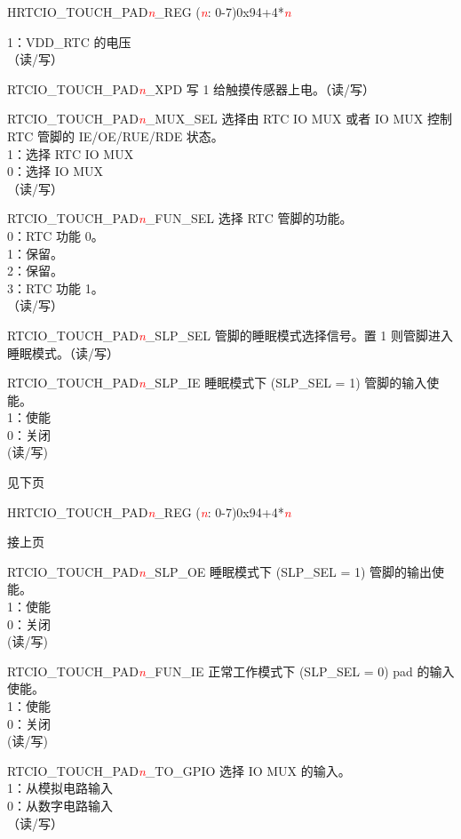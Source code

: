 \begin{register}{H}{RTCIO\_TOUCH\_PAD\textcolor{red}{\it{n}}\_REG (\textcolor{red}{\it{n}}: 0-7)}{0x94+4*\textcolor{red}{\it{n}}}
\begin{regdesc}
\begin{reglist}
1：VDD\_RTC 的电压\\
（读/写）
\item [RTCIO\_TOUCH\_PAD\textcolor{red}{\it{n}}\_XPD] 写 1 给触摸传感器上电。（读/写）
\item [RTCIO\_TOUCH\_PAD\textcolor{red}{\it{n}}\_MUX\_SEL] 选择由 RTC IO MUX 或者 IO MUX 控制 RTC 管脚的 IE/OE/RUE/RDE 状态。\\
1：选择 RTC IO MUX\\
0：选择 IO MUX \\
（读/写）
\item [RTCIO\_TOUCH\_PAD\textcolor{red}{\it{n}}\_FUN\_SEL] 选择 RTC 管脚的功能。\\
0：RTC 功能 0。\\
1：保留。\\
2：保留。\\
3：RTC 功能 1。\\
（读/写）
\item[RTCIO\_TOUCH\_PAD\textcolor{red}{\it{n}}\_SLP\_SEL] 管脚的睡眠模式选择信号。置 1 则管脚进入睡眠模式。（读/写）
\item[RTCIO\_TOUCH\_PAD\textcolor{red}{\it{n}}\_SLP\_IE] 睡眠模式下 (SLP\_SEL = 1) 管脚的输入使能。\\
1：使能\\
0：关闭\\
(读/写)

\item [见下页]
\end{reglist}\end{regdesc}
\end{register}
\addtocounter{Regfloat}{-1}
\begin{register}{H}{RTCIO\_TOUCH\_PAD\textcolor{red}{\it{n}}\_REG (\textcolor{red}{\it{n}}: 0-7)}{0x94+4*\textcolor{red}{\it{n}}}
\begin{regdesc}\begin{reglist}
\item [接上页]
\item[RTCIO\_TOUCH\_PAD\textcolor{red}{\it{n}}\_SLP\_OE] 睡眠模式下 (SLP\_SEL = 1) 管脚的输出使能。\\
1：使能\\
0：关闭\\
(读/写)
\item[RTCIO\_TOUCH\_PAD\textcolor{red}{\it{n}}\_FUN\_IE] 正常工作模式下 (SLP\_SEL = 0) pad 的输入使能。\\
1：使能\\
0：关闭\\
(读/写)
\item[RTCIO\_TOUCH\_PAD\textcolor{red}{\it{n}}\_TO\_GPIO] 选择 IO MUX 的输入。\\
1：从模拟电路输入\\
0：从数字电路输入\\
（读/写）
\end{reglist}\end{regdesc}
\end{register}

